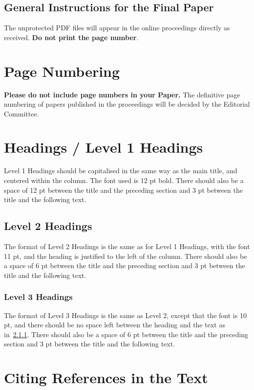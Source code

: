 \documentclass[10pt, a4paper]{article}
\begin{document}
\subsection{General Instructions for the Final Paper}

The unprotected PDF files will appear in the online proceedings directly as received. \textbf{Do not print the page number}.

\section{Page Numbering}

\textbf{Please do not include page numbers in your Paper.} The definitive page numbering of papers published in the proceedings will be decided by the Editorial Committee.

\section{Headings / Level 1 Headings} 

Level 1 Headings should be capitalised in the same way as the main title, and centered within the column. The font used is 12 pt bold. There should also be a space of 12 pt between the title and the preceding section and 3 pt between the title and the following text.

\subsection{Level 2 Headings}

The format of Level 2 Headings is the same as for Level 1 Headings, with the font  11 pt, and the heading is justified to the left of the column. There should also be a space of 6 pt between the title and the preceding section and 3 pt between the title and the following text.

\subsubsection{Level 3 Headings}
\label{level3H}

The format of Level 3 Headings is the same as Level 2, except that the font is  10 pt, and there should be no space left between the heading and the text as in~\ref{level3H}. There should also be a space of 6 pt between the title and the preceding section and 3 pt between the title and the following text.

\section{Citing References in the Text}
\end{document}
